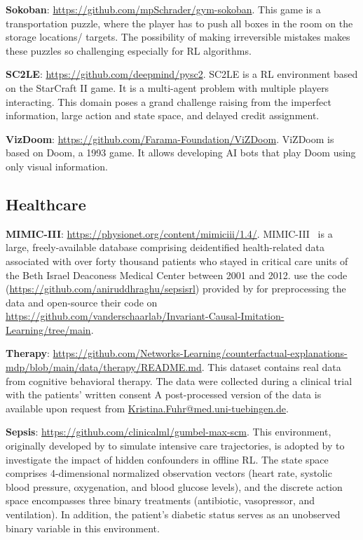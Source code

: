 \documentclass[10pt]{article} %
\theoremstyle{definition}
\begin{document}
\textbf{Sokoban}: \url{https://github.com/mpSchrader/gym-sokoban}. This game is a transportation puzzle, where the player has to push all boxes in the room on the storage locations/ targets. The possibility of making irreversible mistakes makes these puzzles so challenging especially for RL algorithms.

\textbf{SC2LE}: \url{https://github.com/deepmind/pysc2}. SC2LE is a RL environment based on the StarCraft II game. It is a multi-agent problem with multiple players interacting. This domain poses a grand challenge raising from the imperfect information, large action and state space, and delayed credit assignment. 

\textbf{VizDoom}: \url{https://github.com/Farama-Foundation/ViZDoom}. ViZDoom is based on Doom, a 1993 game. It allows developing AI bots that play Doom using only visual information.

\subsection{Healthcare}
\textbf{MIMIC-III}: \url{https://physionet.org/content/mimiciii/1.4/}. MIMIC-III~\citep{johnson2016mimic} is a large, freely-available database comprising deidentified health-related data associated with over forty thousand patients who stayed in critical care units of the Beth Israel Deaconess Medical Center between 2001 and 2012. \citet{luSampleEfficientReinforcementLearning2020a} use the code (\url{https://github.com/aniruddhraghu/sepsisrl}) provided by \citet{raghuDeepReinforcementLearning2017} for preprocessing the data and \citet{bicaInvariantCausalImitation2021a} open-source their code on \url{https://github.com/vanderschaarlab/Invariant-Causal-Imitation-Learning/tree/main}.

\textbf{Therapy}: \url{https://github.com/Networks-Learning/counterfactual-explanations-mdp/blob/main/data/therapy/README.md}. This dataset contains real data from cognitive behavioral therapy. The data were collected during a clinical trial with the patients' written consent A post-processed version of the data is available upon request from \url{Kristina.Fuhr@med.uni-tuebingen.de}.

\textbf{Sepsis}: \url{https://github.com/clinicalml/gumbel-max-scm}. This environment, originally developed by \citet{oberstCounterfactualOffPolicyEvaluation2019} to simulate intensive care trajectories, is adopted by \citet{paceDelphicOfflineReinforcement2023} to investigate the impact of hidden confounders in offline RL. The state space comprises 4-dimensional normalized observation vectors (heart rate, systolic blood pressure, oxygenation, and blood glucose levels), and the discrete action space encompasses three binary treatments (antibiotic, vasopressor, and ventilation). In addition, the patient's diabetic status serves as an unobserved binary variable in this environment. 
\end{document}
